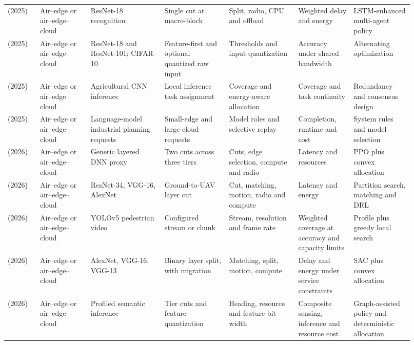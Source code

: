 \begin{longtable}{@{}Y{0.075\linewidth}Y{0.111\linewidth}Y{0.169\linewidth}Y{0.145\linewidth}Y{0.151\linewidth}Y{0.125\linewidth}Y{0.139\linewidth}@{}}
\cite{R0071}\newline\mbox{(2025)} & Air--edge or air--edge--cloud & ResNet-18 recognition & Single cut at macro-block & Split, radio, CPU and offload & Weighted delay and energy & LSTM-enhanced multi-agent policy \\
\cite{R0080}\newline\mbox{(2025)} & Air--edge or air--edge--cloud & ResNet-18 and ResNet-101; CIFAR-10 & Feature-first and optional quantized raw input & Thresholds and input quantization & Accuracy under shared bandwidth & Alternating optimization \\
\cite{R0090}\newline\mbox{(2025)} & Air--edge or air--edge--cloud & Agricultural CNN inference & Local inference task assignment & Coverage and energy-aware allocation & Coverage and task continuity & Redundancy and consensus design \\
\cite{R0145}\newline\mbox{(2025)} & Air--edge or air--edge--cloud & Language-model industrial planning requests & Small-edge and large-cloud requests & Model roles and selective replay & Completion, runtime and cost & System rules and model selection \\
\cite{R0001}\newline\mbox{(2026)} & Air--edge or air--edge--cloud & Generic layered DNN proxy & Two cuts across three tiers & Cuts, edge selection, compute and radio & Latency and resources & PPO plus convex allocation \\
\cite{R0009}\newline\mbox{(2026)} & Air--edge or air--edge--cloud & ResNet-34, VGG-16, AlexNet & Ground-to-UAV layer cut & Cut, matching, motion, radio and compute & Latency and energy & Partition search, matching and DRL \\
\cite{R0036}\newline\mbox{(2026)} & Air--edge or air--edge--cloud & YOLOv5 pedestrian video & Configured stream or chunk & Stream, resolution and frame rate & Weighted coverage at accuracy and capacity limits & Profile plus greedy local search \\
\cite{R0045}\newline\mbox{(2026)} & Air--edge or air--edge--cloud & AlexNet, VGG-16, VGG-13 & Binary layer split, with migration & Matching, split, motion, compute & Delay and energy under service constraints & SAC plus convex allocation \\
\cite{R0054}\newline\mbox{(2026)} & Air--edge or air--edge--cloud & Profiled semantic inference & Tier cuts and feature quantization & Heading, resource and feature bit width & Composite sensing, inference and resource cost & Graph-assisted policy and deterministic allocation \\

\end{longtable}
